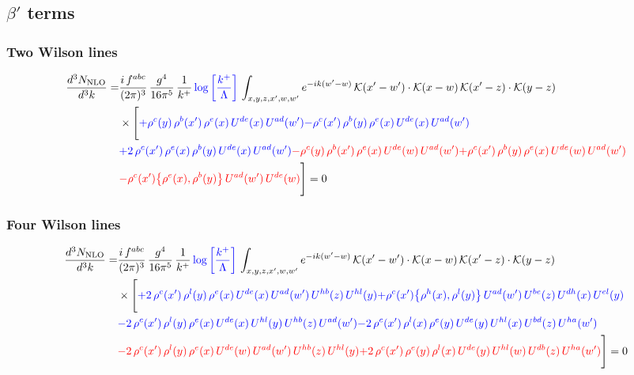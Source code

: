 \documentclass[9pt]{article}
\numberwithin{equation}{section}
\begin{document}
\subsection{$\beta'$ terms}
\subsubsection{Two Wilson lines}
\begin{align}
    \frac{d^{3}N_{\rm NLO}}{d^{3}k}= & \frac{i\,f^{abc}}{(2\pi)^{3}}\,\frac{g^{4}}{16\pi^{5}}\,\frac{1}{k^{+}}\,{\color{blue}\log{\left[\frac{k^{+}}{\Lambda}\right]}}\,\int_{x,y,z,x',w,w'}e^{-ik(w'-w)}\,\mathcal{K}(x'-w')\cdot\mathcal{K}(x-w)\,\mathcal{K}(x'-z)\cdot\mathcal{K}(y-z)\notag \\ & \times\Bigg[{\color{blue}+\rho^{c}(y)\,\rho^{b}(x')\,\rho^{e}(x)\,U^{de}(x)\,U^{ad}(w')}{\color{blue}-\rho^{c}(x')\,\rho^{b}(y)\,\rho^{e}(x)\,U^{de}(x)\,U^{ad}(w')}\notag \\ & {\color{blue}+2\,\rho^{c}(x')\,\rho^{e}(x)\,\rho^{b}(y)\,U^{de}(x)\,U^{ad}(w')}{\color{red}-\rho^{c}(y)\,\rho^{b}(x')\,\rho^{e}(x)\,U^{de}(w)\,U^{ad}(w')}{\color{red}+\rho^{c}(x')\,\rho^{b}(y)\,\rho^{e}(x)\,U^{de}(w)\,U^{ad}(w')}\notag \\ & {\color{red} -\rho^{c}(x')\big\{\rho^{e}(x),\rho^{b}(y)\big\}\,U^{ad}(w')\,U^{de}(w)}\Bigg] = 0 
\end{align}    
\subsubsection{Four Wilson lines}
\begin{align}
    \frac{d^{3}N_{\rm NLO}}{d^{3}k}= & \frac{i\,f^{abc}}{(2\pi)^{3}}\,\frac{g^{4}}{16\pi^{5}}\,\frac{1}{k^{+}}\,{\color{blue}\log{\left[\frac{k^{+}}{\Lambda}\right]}}\,\int_{x,y,z,x',w,w'}e^{-ik(w'-w)}\,\mathcal{K}(x'-w')\cdot\mathcal{K}(x-w)\,\mathcal{K}(x'-z)\cdot\mathcal{K}(y-z)\notag \\ & \times\Bigg[{\color{blue}+2\,\rho^{c}(x')\,\rho^{l}(y)\,\rho^{e}(x)\,U^{de}(x)\,U^{ad}(w')\,U^{hb}(z)\,U^{hl}(y)}{\color{blue}+\rho^{c}(x')\big\{\rho^{h}(x),\rho^{l}(y)\big\}\,U^{ad}(w')\,U^{be}(z)\,U^{dh}(x)\,U^{el}(y)}\notag \\ & {\color{blue}-2\,\rho^{c}(x')\,\rho^{l}(y)\,\rho^{e}(x)\,U^{de}(x)\,U^{hl}(y)\,U^{hb}(z)\,U^{ad}(w')}{\color{blue}-2\,\rho^{c}(x')\,\rho^{l}(x)\,\rho^{e}(y)\,U^{de}(y)\,U^{hl}(x)\,U^{bd}(z)\,U^{ha}(w')}\notag \\ & {\color{red}-2\,\rho^{c}(x')\,\rho^{l}(y)\,\rho^{e}(x)\,U^{de}(w)\,U^{ad}(w')\,U^{hb}(z)\,U^{hl}(y)}{\color{red}+2\,\rho^{c}(x')\,\rho^{e}(y)\,\rho^{l}(x)\,U^{de}(y)\,U^{hl}(w)\,U^{db}(z)\,U^{ha}(w')}\Bigg] = 0
\end{align}
\end{document}
